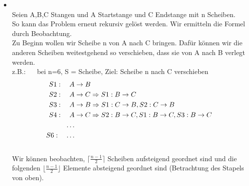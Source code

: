 \begin{itemize}{a)}
\begin{itemize}
\begin{proof}
\begin{itemize}
\begin{equation}
\begin{aligned}
 									   &= 2^{n+1} -1 \\
 							\end{aligned}
 						\end{equation}					
 				\end{itemize}
 			\end{proof}
 			\item Also gilt für $n=100$:\\
 				\begin{equation}
 					\begin{aligned}
 						2^{100}-1 &= 1267650600228229401496703205375 \text{Tage} \\
 								  &\approx 3.473.015.343.091.039.456.155.351.248 \text{Jahre} \notag \\
 								  &\approx 3.473.015 \text{Trilliarden Jahre}
 					\end{aligned}
 				\end{equation}
 		\end{itemize}
 		\item \\
 			Seien A,B,C Stangen und A Startstange und C Endstange mit n Scheiben. \\
 			So kann das Problem erneut rekursiv gelöst werden. Wir ermitteln die Formel durch Beobachtung. \\ 			
 			Zu Beginn wollen wir Scheibe n von A nach C bringen. Dafür können wir die anderen Scheiben weitestgehend so verschieben, dass sie von A nach B verlegt werden. \\
 			z.B.: $\quad$ bei n=6, S = Scheibe, Ziel: Scheibe n nach C verschieben \\
 			\begin{equation}
 				\begin{aligned}
 					S1: \quad A &\rightarrow B \\
 					S2: \quad A &\rightarrow C \Rightarrow S1: B \rightarrow C \\
 					S3: \quad A &\rightarrow B \Rightarrow S1: C \rightarrow B, S2: C \rightarrow B \\
 					S4: \quad A &\rightarrow C \Rightarrow S2: B \rightarrow C, S1: B\rightarrow C, S3: B \rightarrow C \notag \\
 					\dots \\
 					S6: \quad \dots \\					
 				\end{aligned}
			\end{equation} 	\\ 	
			Wir können beobachten, $\lceil{ \frac{n-1}{2} }\rceil$ Scheiben aufsteigend geordnet sind und die folgenden $\lfloor{\frac{n-1}{2}}\rfloor$ Elemente absteigend geordnet sind (Betrachtung des Stapels von oben). \\

\end{itemize}
